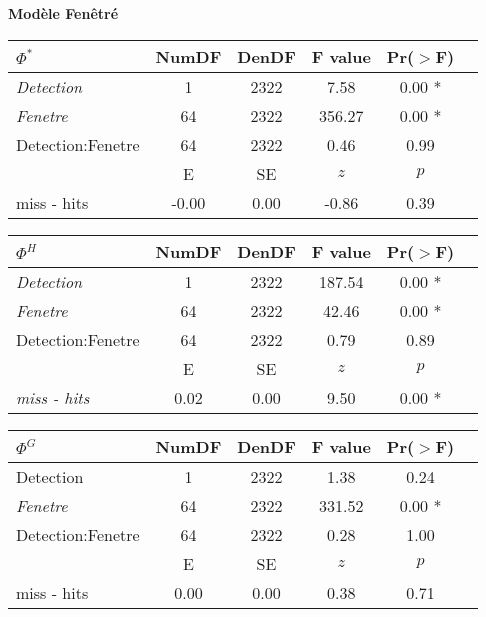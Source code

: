 \begin{table}[!t]
\begin{multicols}{2}
\end{multicols}

\vspace{1cm}

\textbf{Modèle Fenêtré}

\begin{multicols}{2}

\begin{tabular}{|l|*{5}{c|}}
\hline
\textbf{$\Phi^{*}$} & \textbf{NumDF} & \textbf{DenDF} & \textbf{F value} & \textbf{Pr($>$F)} \\ 
\hline
\textit{Detection} & 1 & 2322 & 7.58 & 0.00 * \\ 
\textit{Fenetre} & 64 & 2322 & 356.27 & 0.00 * \\ 
Detection:Fenetre & 64 & 2322 & 0.46 & 0.99 \\ 
\hline
& E & SE & $z$ & $p$ \\
\hline
miss - hits & -0.00 & 0.00 & -0.86 & 0.39 \\ 
\hline
\end{tabular}

\vspace{0.5cm}

\begin{tabular}{|l|*{5}{c|}}
\hline
\textbf{$\Phi^{H}$} & \textbf{NumDF} & \textbf{DenDF} & \textbf{F value} & \textbf{Pr($>$F)} \\ 
\hline
\textit{Detection} & 1 & 2322 & 187.54 & 0.00 * \\ 
\textit{Fenetre} & 64 & 2322 & 42.46 & 0.00 * \\ 
Detection:Fenetre & 64 & 2322 & 0.79 & 0.89 \\ 
\hline
& E & SE & $z$ & $p$ \\
\hline
\textit{miss - hits} & 0.02 & 0.00 & 9.50 & 0.00 * \\ 
\hline
\end{tabular}

\begin{tabular}{|l|*{5}{c|}}
\hline
\textbf{$\Phi^{G}$} & \textbf{NumDF} & \textbf{DenDF} & \textbf{F value} & \textbf{Pr($>$F)} \\ 
\hline
Detection & 1 & 2322 & 1.38 & 0.24 \\ 
\textit{Fenetre} & 64 & 2322 & 331.52 & 0.00 * \\ 
Detection:Fenetre & 64 & 2322 & 0.28 & 1.00 \\ 
\hline
& E & SE & $z$ & $p$ \\
\hline
miss - hits & 0.00 & 0.00 & 0.38 & 0.71 \\ 
\hline
\end{tabular}


\end{multicols}
\end{table}
